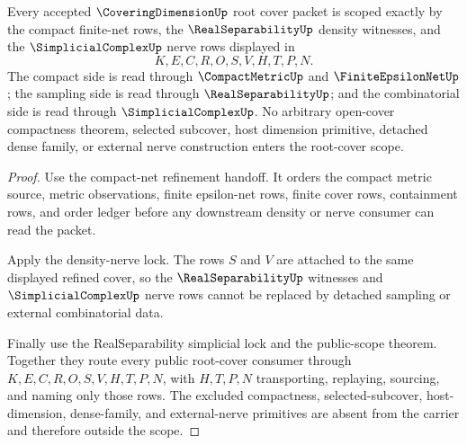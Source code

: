 \begin{theorem}
\label{thm:covering-dimension-root-cover-scope-lock}
Every accepted $\CoveringDimensionUp$ root cover packet is scoped exactly by the compact finite-net rows, the $\RealSeparabilityUp$ density witnesses, and the $\SimplicialComplexUp$ nerve rows displayed in
$$
K,E,C,R,O,S,V,H,T,P,N .
$$
The compact side is read through $\CompactMetricUp$ and $\FiniteEpsilonNetUp$; the sampling side is read through $\RealSeparabilityUp$; and the combinatorial side is read through $\SimplicialComplexUp$. No arbitrary open-cover compactness theorem, selected subcover, host dimension primitive, detached dense family, or external nerve construction enters the root-cover scope.
\end{theorem}
\begin{proof}
Use the compact-net refinement handoff. It orders the compact metric source, metric observations, finite epsilon-net rows, finite cover rows, containment rows, and order ledger before any downstream density or nerve consumer can read the packet.

Apply the density-nerve lock. The rows $S$ and $V$ are attached to the same displayed refined cover, so the $\RealSeparabilityUp$ witnesses and $\SimplicialComplexUp$ nerve rows cannot be replaced by detached sampling or external combinatorial data.

Finally use the RealSeparability simplicial lock and the public-scope theorem. Together they route every public root-cover consumer through $K,E,C,R,O,S,V,H,T,P,N$, with $H,T,P,N$ transporting, replaying, sourcing, and naming only those rows. The excluded compactness, selected-subcover, host-dimension, dense-family, and external-nerve primitives are absent from the carrier and therefore outside the scope.
\end{proof}

